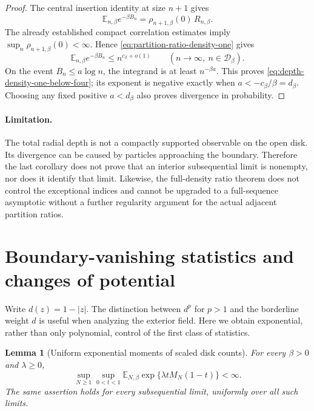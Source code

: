 \documentclass[11pt,a4paper]{article}
\numberwithin{equation}{section}
\newtheorem{lemma}[theorem]{Lemma}
\theoremstyle{definition}
\theoremstyle{remark}
\begin{document}
\begin{proof}
The central insertion identity at size $n+1$ gives
\[
 \mathbb E_{n,\beta}e^{-\beta B_n}
 =\rho_{n+1,\beta}(0)\,R_{n,\beta}.
\]
The already established compact correlation estimates imply
$\sup_n\rho_{n+1,\beta}(0)<\infty$. Hence
\eqref{eq:partition-ratio-density-one} gives
\[
 \mathbb E_{n,\beta}e^{-\beta B_n}
 \leq n^{c_\beta+o(1)}
 \qquad(n\to\infty,\ n\in\mathcal D_\beta).
\]
On the event $B_n\leq a\log n$, the integrand is at least
$n^{-\beta a}$. This proves
\eqref{eq:depth-density-one-below-four}; its exponent is negative exactly
when $a<-c_\beta/\beta=d_\beta$.
Choosing any fixed positive $a<d_\beta$ also proves divergence in
probability.
\end{proof}

\paragraph{Limitation.}
The total radial depth is not a compactly supported observable on the
open disk. Its divergence can be caused by particles approaching the
boundary. Therefore the last corollary does not prove that an interior
subsequential limit is nonempty, nor does it identify that limit. Likewise,
the full-density ratio theorem does not control the exceptional indices
and cannot be upgraded to a full-sequence asymptotic without a further
regularity argument for the actual adjacent partition ratios.

\section{Boundary-vanishing statistics and changes of potential}
\label{sec:weighted-boundary-tilts}

Write $d(z)=1-|z|$. The distinction between $d^p$ for $p>1$ and the
borderline weight $d$ is useful when analyzing the exterior field.
Here we obtain exponential, rather than only polynomial, control of
the first class of statistics.

\begin{lemma}[Uniform exponential moments of scaled disk counts]
\label{lem:scaled-count-exponential}
For every $\beta>0$ and $\lambda\ge0$,
\[
 \sup_{N\ge1}\sup_{0<t<1}
 \mathbb E_{N,\beta}\exp\{\lambda t M_N(1-t)\}<\infty.
\]
The same assertion holds for every subsequential limit, uniformly over
all such limits.
\end{lemma}
\end{document}
